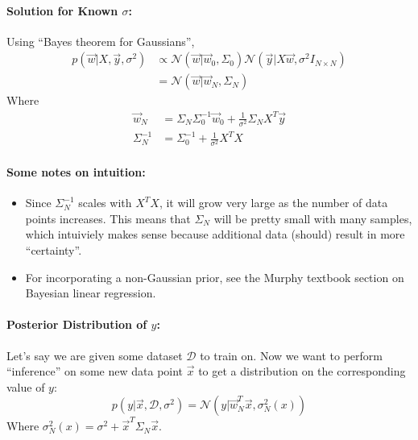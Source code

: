 \documentclass[a4paper,12pt]{report}
\begin{document}
\paragraph{Solution for Known $\sigma$: } Using ``Bayes theorem for Gaussians'',
\begin{equation}
\begin{split}
p(\vec w | X, \vec y, \sigma^2) &\propto \mathcal N(\vec w | \vec w_0, \Sigma_0)\mathcal N(\vec y | X\vec w, \sigma^2 I_{N\times N}) \\
&= \mathcal N(\vec w | \vec w_N, \Sigma_N)
\end{split}
\end{equation}
Where 
\begin{equation}
\begin{split}
\vec w_N &= \Sigma_N\Sigma_0^{-1}\vec w_0 + \frac{1}{\sigma^2} \Sigma_N X^T\vec y \\
\Sigma_N^{-1} &= \Sigma_0^{-1} + \frac{1}{\sigma^2} X^T X
\end{split}
\end{equation}



\paragraph{Some notes on intuition: } 
\begin{itemize}
\item Since $\Sigma_N^{-1}$ scales with $X^T X$, it will grow very large as the number of data points increases. This means that $\Sigma_N$ will be pretty small with many samples, which intuiviely makes sense because additional data (should) result in more ``certainty''.
\item For incorporating a non-Gaussian prior, see the Murphy textbook section on Bayesian linear regression.
\end{itemize}

\paragraph{Posterior Distribution of $y$: } Let's say we are given some dataset $\mathcal D$ to train on. Now we want to perform ``inference'' on some new data point $\vec x$ to get a distribution on the corresponding value of $y$: 
\begin{equation}
p(y | \vec x, \mathcal D, \sigma^2) = \mathcal N(y | \vec w_N^T \vec x, \sigma^2_N(x))
\end{equation}
Where $\sigma_N^2(x) = \sigma^2 + \vec x^T\Sigma_N\vec x$.
\end{document}
